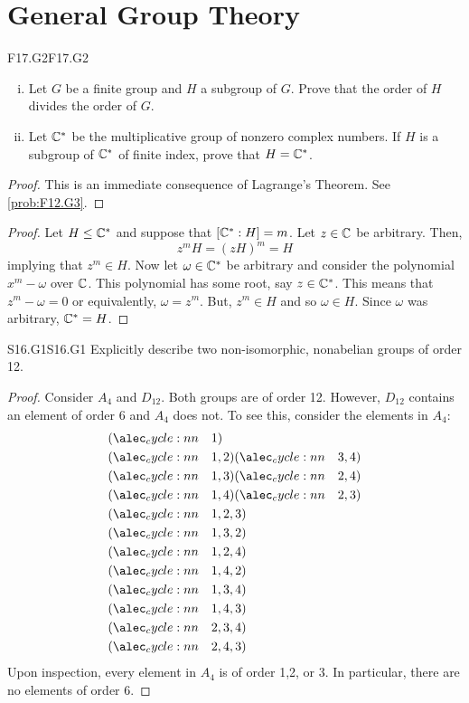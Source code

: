 \documentclass[../AlgebraQualSolutions.tex]{subfiles}
\begin{document}
\section{General Group Theory}

\begin{prob}{F17.G2}{F17.G2}
	\begin{enumerate}[(i)]
		\item Let $G$ be a finite group and $H$ a subgroup of $G$. Prove that the order of $H$ divides the order of $G$.
		\item Let $\mathbb{C}^*$ be the multiplicative group of nonzero complex numbers. If $H$ is a subgroup of $\mathbb{C}^*$ of finite index, prove that $H = \mathbb{C}^*$.
	\end{enumerate}
\end{prob}

\begin{proof}
	This is an immediate consequence of Lagrange's Theorem. See \ref{prob:F12.G3}.
\end{proof}

\begin{proof}
	Let $H \leq \mathbb{C}^*$ and suppose that $[\mathbb{C}^*: H] = m$. Let $z \in \mathbb{C}$ be arbitrary. Then,
		\[z^mH = (zH)^m = H\]
	implying that $z^m \in H$. Now let $\omega \in \mathbb{C}^*$ be arbitrary and consider the polynomial $x^m - \omega$ over $\mathbb{C}$. This polynomial has some root, say $z \in \mathbb{C}^*$. This means that $z^m - \omega = 0$ or equivalently, $\omega = z^m$. But, $z^m \in H$ and so $\omega \in H$. Since $\omega$ was arbitrary, $\mathbb{C}^* = H$.
\end{proof}

\begin{prob}{S16.G1}{S16.G1}
	Explicitly describe two non-isomorphic, nonabelian groups of order 12.
\end{prob}

\begin{proof}
	Consider $A_4$ and $D_{12}$. Both groups are of order 12. However, $D_{12}$ contains an element of order 6 and $A_4$ does not. To see this, consider the elements in $A_4$:
		\begin{align*}
			&\perm{1}\\
			&\perm{1,2}\perm{3,4}\\
			&\perm{1,3}\perm{2,4}\\
			&\perm{1,4}\perm{2,3}\\
			&\perm{1,2,3}\\
			&\perm{1,3,2}\\
			&\perm{1,2,4}\\
			&\perm{1,4,2}\\
			&\perm{1,3,4}\\
			&\perm{1,4,3}\\
			&\perm{2,3,4}\\
			&\perm{2,4,3}
		\end{align*}
	Upon inspection, every element in $A_4$ is of order 1,2, or 3. In particular, there are no elements of order 6.
\end{proof}
\end{document}
